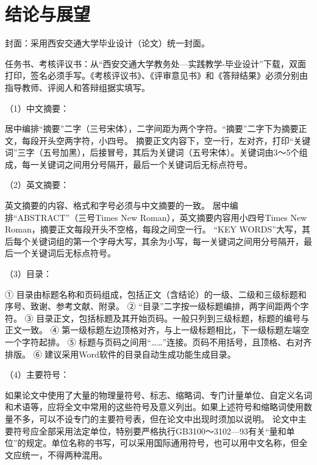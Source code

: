 \documentclass[Mac]{xjtuBSThesis}  %
\begin{document}
\section{结论与展望}
封面：采用西安交通大学毕业设计（论文）统一封面。

任务书、考核评议书：从“西安交通大学教务处—实践教学-毕业设计”下载，双面打印，签名必须手写。《考核评议书》、《评审意见书》和《答辩结果》必须分别由指导教师、评阅人和答辩组据实填写。

（1）中文摘要：

居中编排“摘要”二字（三号宋体），二字间距为两个字符。“摘要”二字下为摘要正文，每段开头空两字符，小四号。
摘要正文内容下，空一行，左对齐，打印“关键词”三字（五号加黑），后接冒号，其后为关键词（五号宋体）。关键词由3～5个组成，每一关键词之间用分号隔开，最后一个关键词后无标点符号。

（2）英文摘要：

英文摘要的内容、格式和字号必须与中文摘要的一致。
居中编排“ABSTRACT”（三号Times New Roman），英文摘要内容用小四号Times New Roman，摘要正文每段开头不空格，每段之间空一行。
“KEY WORDS”大写，其后每个关键词组的第一个字母大写，其余为小写，每一关键词之间用分号隔开，最后一个关键词后无标点符号。

（3）目录：

① 目录由标题名称和页码组成，包括正文（含结论）的一级、二级和三级标题和序号、致谢、参考文献、附录。
② “目录”二字按一级标题编排，两字间距两个字符。
③ 目录正文，包括标题及其开始页码。一般只列到三级标题，标题的编号与正文一致。
④ 第一级标题左边顶格对齐，与上一级标题相比，下一级标题左端空一个字符起排。
⑤ 标题与页码之间用“……”连接。页码不用括号，且顶格、右对齐排版。
⑥ 建议采用Word软件的目录自动生成功能生成目录。

（4）主要符号：

如果论文中使用了大量的物理量符号、标志、缩略词、专门计量单位、自定义名词和术语等，应将全文中常用的这些符号及意义列出。如果上述符号和缩略词使用数量不多，可以不设专门的主要符号表，但在论文中出现时须加以说明。
论文中主要符号应全部采用法定单位，特别要严格执行GB3100～3102—93有关“量和单位”的规定。单位名称的书写，可以采用国际通用符号，也可以用中文名称，但全文应统一，不得两种混用。
\end{document}
